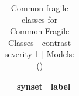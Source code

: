 \begin{table}
\caption{Common fragile classes for Common Fragile Classes - contrast severity 1 | Models: ()}
\label{tab:Common Fragile Classes - contrast severity 1_d41d8cd9}
\begin{tabular}{cll}
\toprule
 & synset & label \\
\midrule
\bottomrule
\end{tabular}
\end{table}
